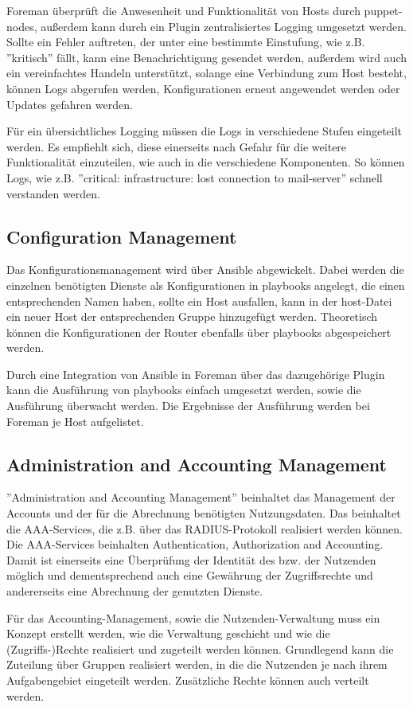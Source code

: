 Foreman überprüft die Anwesenheit und Funktionalität von Hosts durch puppet-nodes, außerdem kann durch ein Plugin zentralisiertes Logging umgesetzt werden. Sollte ein Fehler auftreten, der unter eine bestimmte Einstufung, wie z.B. ''kritisch'' fällt, kann eine Benachrichtigung gesendet werden, außerdem wird auch ein vereinfachtes Handeln unterstützt, solange eine Verbindung zum Host besteht, können Logs abgerufen werden, Konfigurationen erneut angewendet werden oder Updates gefahren werden.

Für ein übersichtliches Logging müssen die Logs in verschiedene Stufen eingeteilt werden. Es empfiehlt sich, diese einerseits nach Gefahr für die weitere Funktionalität einzuteilen, wie auch in die verschiedene Komponenten. So können Logs, wie z.B. ''critical: infrastructure: lost connection to mail-server'' schnell verstanden werden.

\subsection{Configuration Management}
Das Konfigurationsmanagement wird über Ansible abgewickelt. Dabei werden die einzelnen benötigten Dienste als Konfigurationen in playbooks angelegt, die einen entsprechenden Namen haben, sollte ein Host ausfallen, kann in der host-Datei ein neuer Host der entsprechenden Gruppe hinzugefügt werden. Theoretisch können die Konfigurationen der Router ebenfalls über playbooks abgespeichert werden. 

Durch eine Integration von Ansible in Foreman über das dazugehörige Plugin kann die Ausführung von playbooks einfach umgesetzt werden, sowie die Ausführung überwacht werden. Die Ergebnisse der Ausführung werden bei Foreman je Host aufgelistet.

\subsection{Administration and Accounting Management}
''Administration and Accounting Management'' beinhaltet das Management der Accounts und der für die Abrechnung benötigten Nutzungsdaten. Das beinhaltet die AAA-Services, die z.B. über das RADIUS-Protokoll realisiert werden können. Die AAA-Services beinhalten Authentication, Authorization and Accounting. Damit ist einerseits eine Überprüfung der Identität des bzw. der Nutzenden möglich und dementsprechend auch eine Gewährung der Zugriffsrechte und andererseits eine Abrechnung der genutzten Dienste.

Für das Accounting-Management, sowie die Nutzenden-Verwaltung muss ein Konzept erstellt werden, wie die Verwaltung geschieht und wie die (Zugriffs-)Rechte realisiert und zugeteilt werden können. Grundlegend kann die Zuteilung über Gruppen realisiert werden, in die die Nutzenden je nach ihrem Aufgabengebiet eingeteilt werden. Zusätzliche Rechte können auch verteilt werden.

